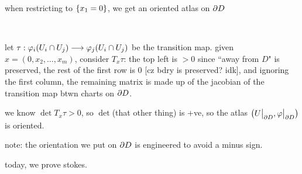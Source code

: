 \begin{prop}
	when restricting to $\left\{{x_{1}=0}\right\}$, we get an oriented atlas on $\partial D$
\end{prop} \

\begin{pf}
	let $\tau:\varphi_{i}(U_{i}\cap U_{j})\longrightarrow\varphi_{j}(U_{i}\cap U_{j})$ be
	the transition map.
	given $x=(0,x_{2},\dots,x_{m})$, consider $T_{x}\tau$:
	the top left is $>0$ since ``away from $D$" is preserved, the rest of
	the first row is 0 [cz bdry is preserved? idk], and ignoring the
	first column, the remaining matrix is made up of the jacobian of
	the transition map btwn charts on $\partial D$.

	we know $\det T_{x}\tau>0$, so $\det$(that other thing) is +ve, so the atlas
	$\left(U\big\rvert_{\partial D},\varphi\big\rvert_{\partial D}\right)$ is oriented.
\end{pf}
note: the orientation we put on $\partial D$ is engineered to avoid a minus sign.

today, we prove stokes.

